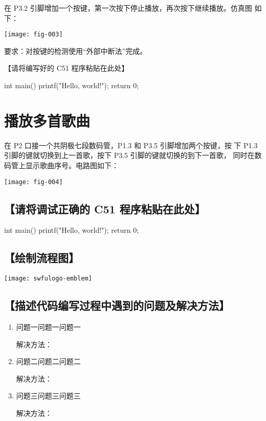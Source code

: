 \documentclass{swfulabreport}
\begin{document}
在 P3.2 引脚增加一个按键，第一次按下停止播放，再次按下继续播放。仿真图
如下：

\begin{center}
  \texttt{[image: fig-003]}
\end{center}

要求：对按键的检测使用“外部中断法”完成。

【请将编写好的 C51 程序粘贴在此处】

\begin{ccode}
int main(){
  printf("Hello, world!\n");
  return 0;
}
\end{ccode}

\section{播放多首歌曲}

在 P2 口接一个共阴极七段数码管，P1.3 和 P3.5 引脚增加两个按键，按
下 P1.3 引脚的键就切换到上一首歌，按下 P3.5 引脚的键就切换的到下一首歌，
同时在数码管上显示歌曲序号。电路图如下：

\begin{center}
  \texttt{[image: fig-004]}
\end{center}


\subsection{【请将调试正确的 C51 程序粘贴在此处】}

\begin{ccode}
int main(){
  printf("Hello, world!\n");
  return 0;
}
\end{ccode}

\subsection{【绘制流程图】}

\begin{center}
  \texttt{[image: swfulogo-emblem]}
\end{center}


\subsection{【描述代码编写过程中遇到的问题及解决方法】}

\begin{enumerate}
\item 问题一问题一问题一

  解决方法：\zhlipsum[1]

\item 问题二问题二问题二

  解决方法：\zhlipsum[2]

\item 问题三问题三问题三
  
  解决方法：\zhlipsum[3]

\end{enumerate}
\end{document}
